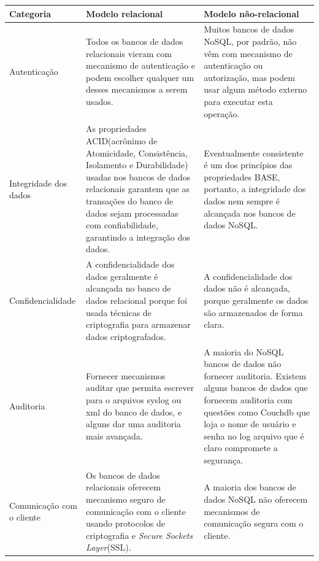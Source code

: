 \begin{tabularx}{0.9\textwidth} { 
  | >{\raggedright\arraybackslash}X 
  | >{\raggedright\arraybackslash}X 
  | >{\raggedright\arraybackslash}X | }
 \hline
 Categoria & Modelo relacional & Modelo não-relacional \\
 \hline
 Autenticação  & Todos os bancos de dados relacionais vieram com mecanismo de autenticação e podem escolher qualquer um desses mecanismos a serem usados.  & Muitos bancos de dados NoSQL, por padrão, não vêm com mecanismo de autenticação ou autorização, mas podem usar algum método externo para executar esta operação.  \\
\hline
Integridade dos dados & As propriedades ACID(acrônimo de Atomicidade, Consistência, Isolamento e Durabilidade) usadas nos bancos de dados relacionais garantem que as transações do banco de dados sejam processadas com confiabilidade, garantindo a integração dos dados. & Eventualmente consistente é um dos princípios das propriedades BASE, portanto, a integridade dos dados nem sempre é alcançada nos bancos de dados NoSQL. \\
\hline
Confidencialidade & A confidencialidade dos dados geralmente é alcançada no banco de dados relacional porque foi usada técnicas de criptografia para armazenar dados criptografados. & A confidencialidade dos dados não é alcançada, porque geralmente os dados são armazenados de forma clara. \\
\hline
Auditoria & Fornecer mecanismos auditar que permita escrever para o arquivos syslog ou xml do banco de dados, e alguns dar uma auditoria mais avançada. & A maioria do NoSQL bancos de dados não fornecer auditoria. Existem alguns bancos de dados que fornecem auditoria com questões como Couchdb que loja o nome de usuário e senha no log arquivo que é claro compromete a segurança. \\
\hline
Comunicação com o cliente & Os bancos de dados relacionais oferecem mecanismo seguro de comunicação com o cliente usando protocolos de criptografia e \textit{Secure Sockets Layer}(SSL). & A maioria dos bancos de dados NoSQL não oferecem mecanismos de comunicação segura com o cliente. \\
\hline
\end{tabularx}



